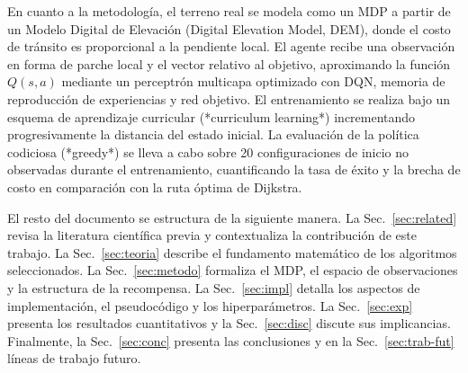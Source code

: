 En cuanto a la metodología, el terreno real se modela como un MDP a partir de un Modelo Digital de Elevación (Digital Elevation Model, DEM), donde el costo de tránsito es proporcional a la pendiente local. El agente recibe una observación en forma de parche local y el vector relativo al objetivo, aproximando la función $Q(s,a)$ mediante un perceptrón multicapa optimizado con DQN, memoria de reproducción de experiencias y red objetivo. El entrenamiento se realiza bajo un esquema de aprendizaje curricular (*curriculum learning*) incrementando progresivamente la distancia del estado inicial. La evaluación de la política codiciosa (*greedy*) se lleva a cabo sobre 20 configuraciones de inicio no observadas durante el entrenamiento, cuantificando la tasa de éxito y la brecha de costo en comparación con la ruta óptima de Dijkstra.

El resto del documento se estructura de la siguiente manera. La Sec.~\ref{sec:related} revisa la literatura científica previa y contextualiza la contribución de este trabajo. La Sec.~\ref{sec:teoria} describe el fundamento matemático de los algoritmos seleccionados. La Sec.~\ref{sec:metodo} formaliza el MDP, el espacio de observaciones y la estructura de la recompensa. La Sec.~\ref{sec:impl} detalla los aspectos de implementación, el pseudocódigo y los hiperparámetros. La Sec.~\ref{sec:exp} presenta los resultados cuantitativos y la Sec.~\ref{sec:disc} discute sus implicancias. Finalmente, la Sec.~\ref{sec:conc} presenta las conclusiones y en la Sec.~\ref{sec:trab-fut} líneas de trabajo futuro.

